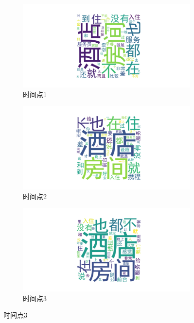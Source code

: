 \documentclass[UTF8,a4paper,15pt,titlepage,oneside]{ctexbook}
\begin{document}
\begin{figure}[htbp]
  \centering
  
  \begin{subfigure}{0.32\textwidth}
    \includegraphics[width=\linewidth]{pictures/14.png}
    \caption{时间点1}
  \end{subfigure}
  \begin{subfigure}{0.32\textwidth}
    \includegraphics[width=\linewidth]{pictures/15.png}
    \caption{时间点2}
  \end{subfigure}
  \hfill
  \begin{subfigure}{0.32\textwidth}
    \includegraphics[width=\linewidth]{pictures/16.png}
    \caption{时间点3}
  \end{subfigure}
  

\end{figure}
\end{document}
